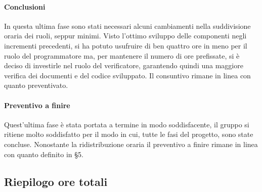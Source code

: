 		\paragraph{Conclusioni}
		In questa ultima fase sono stati necessari alcuni cambiamenti nella suddivisione oraria dei ruoli, seppur minimi.
		Visto l'ottimo sviluppo delle componenti negli incrementi precedenti, si ha potuto usufruire di ben quattro ore in meno per il ruolo del programmatore ma, per mantenere il numero di ore prefissate, si è deciso di investirle nel ruolo del verificatore, garantendo quindi una maggiore verifica dei documenti e del codice sviluppato. Il consuntivo rimane in linea con quanto preventivato.
		
		\paragraph{Preventivo a finire}
		Quest'ultima fase è stata portata a termine in modo soddisfacente, il gruppo si ritiene molto soddisfatto per il modo in cui, tutte le fasi del progetto, sono state concluse. Nonostante la ridistribuzione oraria il preventivo a finire rimane in linea con quanto definito in \S5.
		\pagebreak
		
		
		
		\subsection{Riepilogo ore totali}
